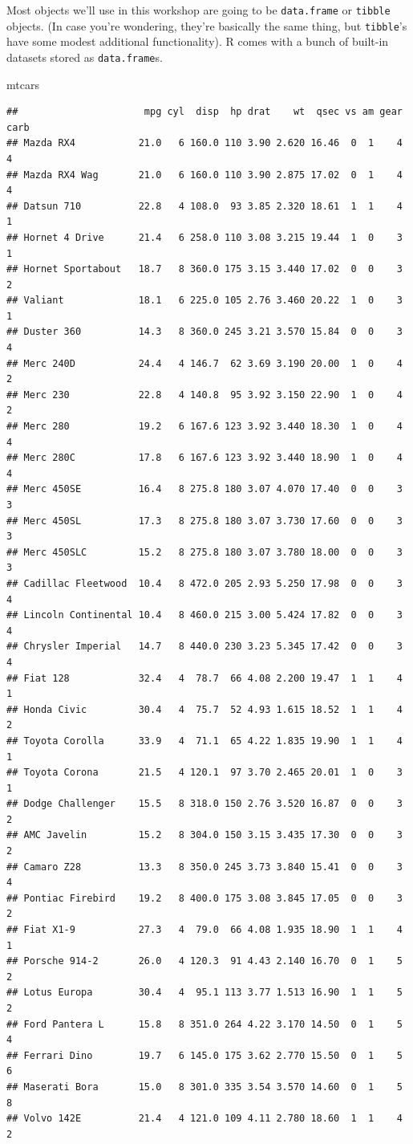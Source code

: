 \documentclass[12pt,letterpaperpaper,openany]{book}
\newenvironment{Shaded}{\begin{snugshade}}{\end{snugshade}}
\newcommand{\NormalTok}[1]{#1}
\begin{document}
Most objects we'll use in this workshop are going to be \texttt{data.frame} or \texttt{tibble} objects. (In case you're wondering, they're basically the same thing, but \texttt{tibble}'s have some modest additional functionality). R comes with a bunch of built-in datasets stored as \texttt{data.frame}s.

\begin{Shaded}
\begin{Highlighting}[]
\NormalTok{mtcars}
\end{Highlighting}
\end{Shaded}

\begin{verbatim}
##                      mpg cyl  disp  hp drat    wt  qsec vs am gear carb
## Mazda RX4           21.0   6 160.0 110 3.90 2.620 16.46  0  1    4    4
## Mazda RX4 Wag       21.0   6 160.0 110 3.90 2.875 17.02  0  1    4    4
## Datsun 710          22.8   4 108.0  93 3.85 2.320 18.61  1  1    4    1
## Hornet 4 Drive      21.4   6 258.0 110 3.08 3.215 19.44  1  0    3    1
## Hornet Sportabout   18.7   8 360.0 175 3.15 3.440 17.02  0  0    3    2
## Valiant             18.1   6 225.0 105 2.76 3.460 20.22  1  0    3    1
## Duster 360          14.3   8 360.0 245 3.21 3.570 15.84  0  0    3    4
## Merc 240D           24.4   4 146.7  62 3.69 3.190 20.00  1  0    4    2
## Merc 230            22.8   4 140.8  95 3.92 3.150 22.90  1  0    4    2
## Merc 280            19.2   6 167.6 123 3.92 3.440 18.30  1  0    4    4
## Merc 280C           17.8   6 167.6 123 3.92 3.440 18.90  1  0    4    4
## Merc 450SE          16.4   8 275.8 180 3.07 4.070 17.40  0  0    3    3
## Merc 450SL          17.3   8 275.8 180 3.07 3.730 17.60  0  0    3    3
## Merc 450SLC         15.2   8 275.8 180 3.07 3.780 18.00  0  0    3    3
## Cadillac Fleetwood  10.4   8 472.0 205 2.93 5.250 17.98  0  0    3    4
## Lincoln Continental 10.4   8 460.0 215 3.00 5.424 17.82  0  0    3    4
## Chrysler Imperial   14.7   8 440.0 230 3.23 5.345 17.42  0  0    3    4
## Fiat 128            32.4   4  78.7  66 4.08 2.200 19.47  1  1    4    1
## Honda Civic         30.4   4  75.7  52 4.93 1.615 18.52  1  1    4    2
## Toyota Corolla      33.9   4  71.1  65 4.22 1.835 19.90  1  1    4    1
## Toyota Corona       21.5   4 120.1  97 3.70 2.465 20.01  1  0    3    1
## Dodge Challenger    15.5   8 318.0 150 2.76 3.520 16.87  0  0    3    2
## AMC Javelin         15.2   8 304.0 150 3.15 3.435 17.30  0  0    3    2
## Camaro Z28          13.3   8 350.0 245 3.73 3.840 15.41  0  0    3    4
## Pontiac Firebird    19.2   8 400.0 175 3.08 3.845 17.05  0  0    3    2
## Fiat X1-9           27.3   4  79.0  66 4.08 1.935 18.90  1  1    4    1
## Porsche 914-2       26.0   4 120.3  91 4.43 2.140 16.70  0  1    5    2
## Lotus Europa        30.4   4  95.1 113 3.77 1.513 16.90  1  1    5    2
## Ford Pantera L      15.8   8 351.0 264 4.22 3.170 14.50  0  1    5    4
## Ferrari Dino        19.7   6 145.0 175 3.62 2.770 15.50  0  1    5    6
## Maserati Bora       15.0   8 301.0 335 3.54 3.570 14.60  0  1    5    8
## Volvo 142E          21.4   4 121.0 109 4.11 2.780 18.60  1  1    4    2
\end{verbatim}
\end{document}
